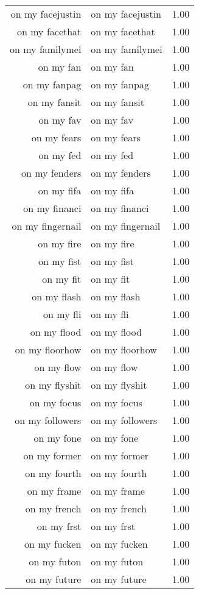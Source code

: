 \begin{table}[ht]
\begin{tabular}{rlr}
  on my facejustin & on my facejustin & 1.00 \\ 
  on my facethat & on my facethat & 1.00 \\ 
  on my familymei & on my familymei & 1.00 \\ 
  on my fan & on my fan & 1.00 \\ 
  on my fanpag & on my fanpag & 1.00 \\ 
  on my fansit & on my fansit & 1.00 \\ 
  on my fav & on my fav & 1.00 \\ 
  on my fears & on my fears & 1.00 \\ 
  on my fed & on my fed & 1.00 \\ 
  on my fenders & on my fenders & 1.00 \\ 
  on my fifa & on my fifa & 1.00 \\ 
  on my financi & on my financi & 1.00 \\ 
  on my fingernail & on my fingernail & 1.00 \\ 
  on my fire & on my fire & 1.00 \\ 
  on my fist & on my fist & 1.00 \\ 
  on my fit & on my fit & 1.00 \\ 
  on my flash & on my flash & 1.00 \\ 
  on my fli & on my fli & 1.00 \\ 
  on my flood & on my flood & 1.00 \\ 
  on my floorhow & on my floorhow & 1.00 \\ 
  on my flow & on my flow & 1.00 \\ 
  on my flyshit & on my flyshit & 1.00 \\ 
  on my focus & on my focus & 1.00 \\ 
  on my followers & on my followers & 1.00 \\ 
  on my fone & on my fone & 1.00 \\ 
  on my former & on my former & 1.00 \\ 
  on my fourth & on my fourth & 1.00 \\ 
  on my frame & on my frame & 1.00 \\ 
  on my french & on my french & 1.00 \\ 
  on my frst & on my frst & 1.00 \\ 
  on my fucken & on my fucken & 1.00 \\ 
  on my futon & on my futon & 1.00 \\ 
  on my future & on my future & 1.00 \\ 

\end{tabular}
\end{table}
